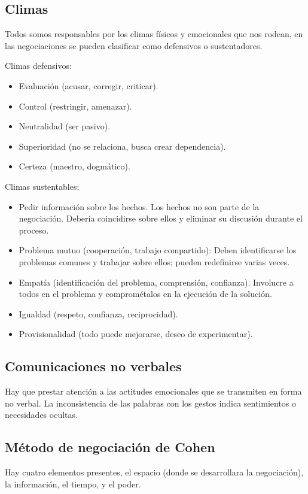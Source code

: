 \documentclass[titlepage,a4paper]{article}
\begin{document}
\subsection*{Climas}
Todos somos responsables por los climas físicos y emocionales que nos rodean, en las negociaciones se pueden clasificar como defensivos o sustentadores.

Climas defensivos:
\begin{itemize}
    \item Evaluación (acusar, corregir, criticar).
    \item Control (restringir, amenazar).
    \item Neutralidad (ser pasivo).
    \item Superioridad (no se relaciona, busca crear dependencia).
    \item Certeza (maestro, dogmático).
\end{itemize}

Climas sustentables:
\begin{itemize}
   \item Pedir información sobre los hechos. Los hechos no son parte de la negociación. Debería coincidirse sobre ellos y eliminar su discusión durante el proceso.
   \item Problema mutuo (cooperación, trabajo compartido): Deben identificarse los problemas comunes y trabajar sobre ellos; pueden redefinirse varias veces.
   \item Empatía (identificación del problema, comprensión, confianza). Involucre a todos en el problema y comprométalos en la ejecución de la solución.
   \item Igualdad (respeto, confianza, reciprocidad).
   \item Provisionalidad (todo puede mejorarse, deseo de experimentar).
\end{itemize}

\subsection*{Comunicaciones no verbales}
Hay que prestar atención a las actitudes emocionales que se transmiten en forma no verbal. La inconsistencia de las palabras con los gestos indica sentimientos o necesidades ocultas.


\subsection*{Método de negociación de Cohen}
Hay cuatro elementos presentes, el espacio (donde se desarrollara la negociación), la información, el tiempo, y el poder.
\end{document}
